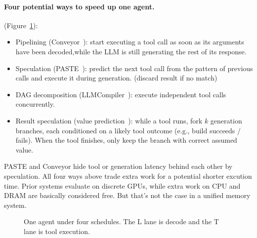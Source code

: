 \documentclass[11pt]{article}
\newcommand{\blk}[6][]{%
  \draw[fill=#6,#1] (#2,#4) rectangle (#3,#4+0.4);
  \node at ({(#2+#3)/2},#4+0.2) {\scriptsize #5};}
\begin{document}
\paragraph{Four potential ways to speed up one agent.} (Figure~\ref{fig:spec}):
\begin{itemize}
  \item Pipelining (Conveyor~\cite{conveyor}):
    start executing a tool call as soon as its arguments have been decoded,while the LLM is still generating the rest of its response.
  \item Speculation (PASTE~\cite{paste}):
    predict the next tool call from the pattern of previous calls and execute it during generation. (discard result if no match)
  \item DAG decomposition (LLMCompiler~\cite{llmcompiler}):
    execute independent tool calls concurrently.
  \item Result speculation (value prediction~\cite{lipasti}):
    while a tool runs, fork $k$ generation branches, each conditioned on a
    likely tool outcome (e.g., build succeeds / fails). When the tool finishes, only keep the branch with correct assumed value.
\end{itemize}


PASTE and Conveyor hide tool or generation latency behind each other by speculation. All four ways above trade extra work
for a potential shorter excution time. Prior systems evaluate on discrete GPUs, while extra work on CPU and DRAM are basically considered free. But that's not the case in a unified memory system.


\begin{figure}[h]
\centering
{}
\caption{One agent under four schedules. The L lane is decode and the T lane is tool execution.}
\label{fig:spec}
\end{figure}
\end{document}
